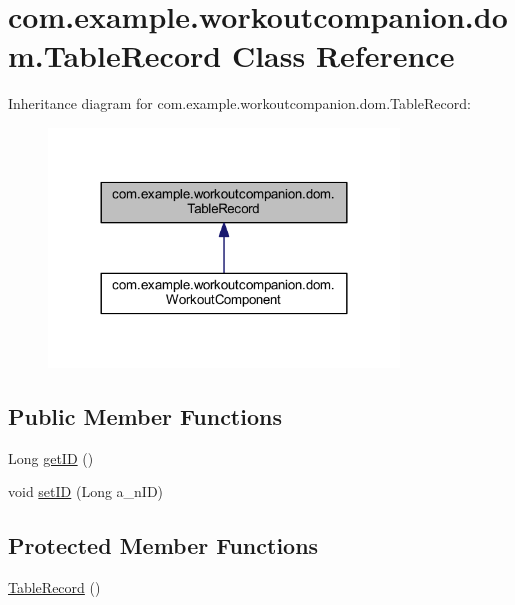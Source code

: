 \hypertarget{classcom_1_1example_1_1workoutcompanion_1_1dom_1_1_table_record}{\section{com.\-example.\-workoutcompanion.\-dom.\-Table\-Record Class Reference}
\label{classcom_1_1example_1_1workoutcompanion_1_1dom_1_1_table_record}
}


Inheritance diagram for com.\-example.\-workoutcompanion.\-dom.\-Table\-Record\-:\nopagebreak
\begin{figure}[H]
\begin{center}
\leavevmode
\includegraphics[width=264pt]{classcom_1_1example_1_1workoutcompanion_1_1dom_1_1_table_record__inherit__graph}
\end{center}
\end{figure}
\subsection*{Public Member Functions}
\begin{DoxyCompactItemize}
\item 
Long \hyperlink{classcom_1_1example_1_1workoutcompanion_1_1dom_1_1_table_record_aaad8f1c67d8e69fbc651322d5e40a2fc}{get\-I\-D} ()
\item 
void \hyperlink{classcom_1_1example_1_1workoutcompanion_1_1dom_1_1_table_record_a391da9c1bd03df54429f6b64602df2ce}{set\-I\-D} (Long a\-\_\-n\-I\-D)
\end{DoxyCompactItemize}
\subsection*{Protected Member Functions}
\begin{DoxyCompactItemize}
\item 
\hyperlink{classcom_1_1example_1_1workoutcompanion_1_1dom_1_1_table_record_af45541b51d998b04d359ffae63569773}{Table\-Record} ()
\end{DoxyCompactItemize}
